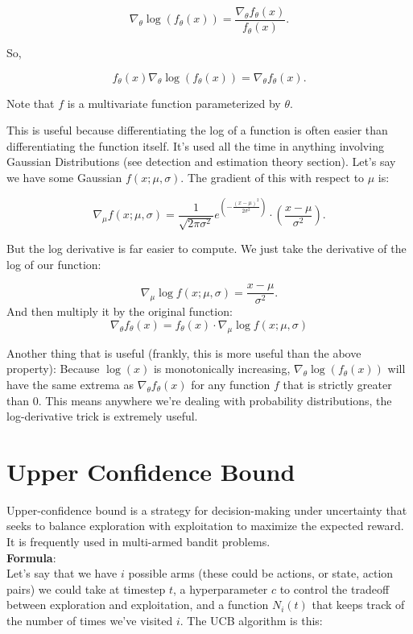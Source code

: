 \documentclass[12pt]{article}
\begin{document}
\[
\nabla_{\theta} \log(f_{\theta}(x)) = \frac{\nabla_{\theta} f_{\theta}(x)}{f_{\theta}(x)}.
\]

So,

\[
f_{\theta}(x) \nabla_{\theta} \log(f_{\theta}(x)) = \nabla_{\theta} f_{\theta}(x).
\]

Note that \( f \) is a multivariate function parameterized by \( \theta \).

This is useful because differentiating the log of a function is often easier than differentiating the function itself. It's used all the time in anything involving Gaussian Distributions (see detection and estimation theory section). Let's say we have some Gaussian \( f(x; \mu, \sigma) \). The gradient of this with respect to \( \mu \) is:

\[
\nabla_{\mu} f(x; \mu, \sigma) = \frac{1}{\sqrt{2\pi\sigma^2}} e^{\left(-\frac{(x - \mu)^2}{2\sigma^2}\right)} \cdot \left(\frac{x - \mu}{\sigma^2}\right).
\]

But the log derivative is far easier to compute. We just take the derivative of the log of our function:

\[
\nabla_{\mu} \log f(x; \mu, \sigma) = \frac{x - \mu}{\sigma^2}.
\]
And then multiply it by the original function:
\[
\nabla_{\theta} f_{\theta}(x) = f_{\theta}(x) \cdot \nabla_{\mu} \log f(x; \mu, \sigma)
\]

Another thing that is useful (frankly, this is more useful than the above property): Because \(\log(x)\) is monotonically increasing, \(\nabla_{\theta}\log(f_{\theta}(x))\) will have the same extrema as \(\nabla_{\theta}f_{\theta}(x)\) for any function \(f\) that is strictly greater than 0. This means anywhere we're dealing with probability distributions, the log-derivative trick is extremely useful.
\section{Upper Confidence Bound}
Upper-confidence bound is a strategy for decision-making under uncertainty that seeks to balance exploration with exploitation to maximize the expected reward. It is frequently used in multi-armed bandit problems.\\

\textbf{Formula}:\\
Let's say that we have \(i\) possible arms (these could be actions, or state, action pairs) we could take at timestep \(t\), a hyperparameter \(c\) to control the tradeoff between exploration and exploitation, and a function \(N_i(t)\) that keeps track of the number of times we've visited \(i\). The UCB algorithm is this:
\end{document}
